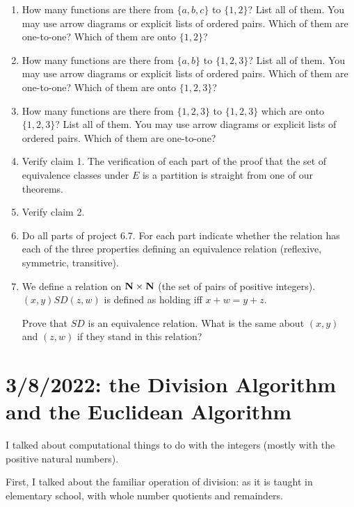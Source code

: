 \documentclass[12pt]{article}
\begin{document}
\begin{enumerate}

\item  How many functions are there from $\{a,b,c\}$ to $\{1,2\}$?  List all of them.  You may use arrow diagrams or explicit lists of ordered pairs.  Which of them are one-to-one?  Which of them are onto $\{1,2\}$?

\item  How many functions are there from $\{a,b\}$ to $\{1,2,3\}$?  List all of them.  You may use arrow diagrams or explicit lists of ordered pairs.  Which of them are one-to-one?  Which of them are onto $\{1,2,3\}$?

\item  How many functions are there from $\{1,2,3\}$ to $\{1,2,3\}$ which are onto $\{1,2,3\}$?  List all of them.  You may use arrow diagrams or explicit lists of ordered pairs.  Which of them are one-to-one?

\item Verify claim 1.  The verification of each part of the proof that the set of equivalence classes under $E$ is a partition is straight from one of our theorems.

\item Verify claim 2.

\item Do all parts of project 6.7. For each part indicate whether the relation has each of the three properties defining an equivalence relation (reflexive, symmetric, transitive).

\item  We define a relation on ${\bf N} \times {\bf N}$ (the set of pairs of positive integers).  $(x,y) SD (z,w)$ is defined as holding iff $x+w=y+z$.

Prove that $SD$ is an equivalence relation.  What is the same about $(x,y)$ and $(z,w)$ if they stand in this relation?

\end{enumerate}

\newpage

\section{3/8/2022:  the Division Algorithm and the Euclidean Algorithm}

I talked about computational things to do with the integers (mostly with the positive natural numbers).

First, I talked about the familiar operation of division:  as it is taught in elementary school, with whole number quotients and remainders.
\end{document}
